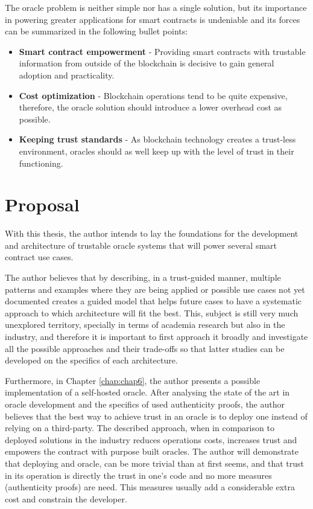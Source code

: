 The oracle problem is neither simple nor has a single solution, but its importance in powering greater applications for smart contracts is undeniable and its forces can be summarized in the following bullet points:


\begin{itemize}
    \item \textbf{Smart contract empowerment} - Providing smart contracts with trustable information from outside of the blockchain is decisive to gain general adoption and practicality.
    \item \textbf{Cost optimization} - Blockchain operations tend to be quite expensive, therefore, the oracle solution should introduce a lower overhead cost as possible.
    \item \textbf{Keeping trust standards} - As blockchain technology creates a trust-less environment, oracles should as well keep up with the level of trust in their functioning.
\end{itemize}

\section{Proposal}

With this thesis, the author intends to lay the foundations for the development and architecture of trustable oracle systems that will power several smart contract use cases.

The author believes that by describing, in a trust-guided manner, multiple patterns and examples where they are being applied or possible use cases not yet documented creates a guided model that helps future cases to have a systematic approach to which architecture will fit the best. This, subject is still very much unexplored territory, specially in terms of academia research but also in the industry, and therefore it is important to first approach it broadly and investigate all the possible approaches and their trade-offs so that latter studies can be developed on the specifics of each architecture.

Furthermore, in Chapter \ref{chap:chap6}, the author presents a possible implementation of a self-hosted oracle. After analysing the state of the art in oracle development and the specifics of used authenticity proofs, the author believes that the best way to achieve trust in an oracle is to deploy one instead of relying on a third-party. The described approach, when in comparison to deployed solutions in the industry reduces operations costs, increases trust and empowers the contract with purpose built oracles. The author will demonstrate that deploying and oracle, can be more trivial than at first seems, and that trust in its operation is directly the trust in one's code and no more measures (authenticity proofs) are need. This measures usually add a considerable extra cost and constrain the developer.


